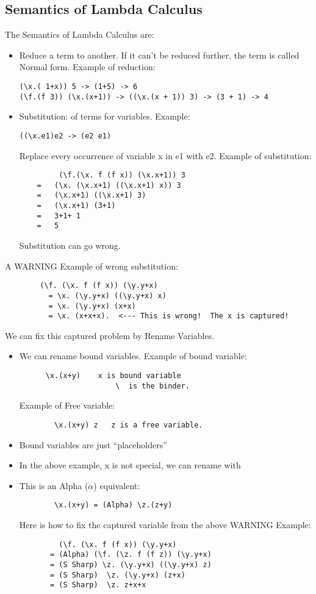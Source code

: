 \documentclass{article}
\begin{document}
\subsection{Semantics of Lambda Calculus}
The Semantics of Lambda Calculus are:
\begin{itemize}
\item Reduce a term to another. If it can’t be reduced further, the term is called Normal form. 
\newline Example of reduction:
\begin{lstlisting}
(\x.( 1+x)) 5 -> (1+5) -> 6
(\f.(f 3)) (\x.(x+1)) -> ((\x.(x + 1)) 3) -> (3 + 1) -> 4
 \end{lstlisting}
 \item Substitution: of terms for variables. 
\newline Example: 
\begin{lstlisting}
((\x.e1)e2 -> (e2 e1)
 \end{lstlisting}
  Replace every occurrence of variable x in e1 with e2.
\newline Example of substitution:
\begin{lstlisting}
         (\f.(\x. f (f x)) (\x.x+1)) 3
    =   (\x. (\x.x+1) ((\x.x+1) x)) 3
    =   (\x.x+1) ((\x.x+1) 3)
    =   (\x.x+1) (3+1)
    =   3+1+ 1
    =   5
 \end{lstlisting}
 Substitution can go wrong. 
\end{itemize}
A WARNING Example of wrong substitution:
\begin{lstlisting}
        (\f. (\x. f (f x)) (\y.y+x)
          = \x. (\y.y+x) ((\y.y+x) x)
          = \x. (\y.y+x) (x+x)
          = \x. (x+x+x).  <--- This is wrong!  The x is captured!
  \end{lstlisting}
   We can fix this captured problem by Rename Variables.
\begin{itemize}
\item We can rename bound variables.
\newline Example of bound variable:
\begin{lstlisting}
      \x.(x+y)    x is bound variable
                      \  is the binder.
  \end{lstlisting}
  Example of Free variable:
\begin{lstlisting}
        \x.(x+y) z   z is a free variable.
  \end{lstlisting}
  \item Bound variables are just “placeholders”
  \item In the above example, x is not special, we can rename with 
  \item This is an Alpha ($\alpha$) equivalent:
  \begin{lstlisting}
        \x.(x+y) = (Alpha) \z.(z+y)
  \end{lstlisting}
         Here is how to fix the captured variable from the above WARNING Example:
\begin{lstlisting}
         (\f. (\x. f (f x)) (\y.y+x)
       = (Alpha) (\f. (\z. f (f z)) (\y.y+x)
       = (S Sharp) \z. (\y.y+x) ((\y.y+x) z)
       = (S Sharp)  \z. (\y.y+x) (z+x)
       = (S Sharp)  \z. z+x+x
  \end{lstlisting}
\end{itemize}
\end{document}
